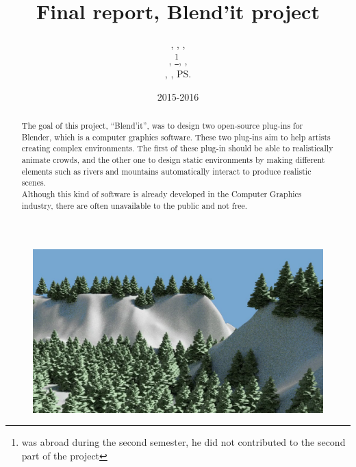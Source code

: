\documentclass[a4paper,11pt]{article}
\title{Final report, Blend'it project}
\author{\bb, \gc, \dl,\\ \vl, \om\footnote{was abroad during the second semester, he did not contributed to the second part of the project}, \mr,\\ \me, \js, \ps}
\date{2015-2016}
\begin{document}
\maketitle

\begin{figure}[h!]
\centerline{\includegraphics[scale=0.3]{img/demo.png}}
\end{figure}
\begin{abstract}
The goal of this project, ``Blend'it'', was to design two open-source plug-ins for Blender, which is a computer graphics software. These two plug-ins aim to help artists creating complex environments. The first of these plug-in should be able to realistically animate crowds, and the other one to design static environments by making different elements such as rivers and mountains automatically interact to produce realistic scenes. \\
Although this kind of software is already developed in the Computer Graphics industry, there are often unavailable to the public and not free.
\end{abstract}

\newpage
{}

\tableofcontents

\newpage


\newpage


\clearpage


\clearpage


\clearpage




\newpage
\begingroup




\endgroup
\end{document}
